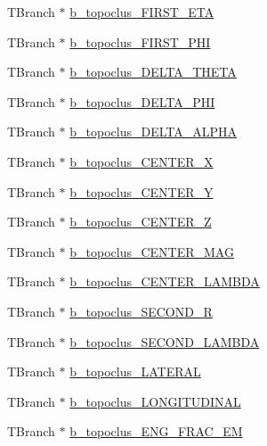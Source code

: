 \begin{DoxyCompactItemize}
T\+Branch $\ast$ \hyperlink{classXMLWriter_aa6c215ca55351d5ff1705ed5ba0a43f6}{b\+\_\+topoclus\+\_\+\+F\+I\+R\+S\+T\+\_\+\+E\+TA}
\item 
T\+Branch $\ast$ \hyperlink{classXMLWriter_aa2acb0af74a1f31832cbe17f22d8b048}{b\+\_\+topoclus\+\_\+\+F\+I\+R\+S\+T\+\_\+\+P\+HI}
\item 
T\+Branch $\ast$ \hyperlink{classXMLWriter_a5fbbe6f789deea441eea3dc49c8a2bda}{b\+\_\+topoclus\+\_\+\+D\+E\+L\+T\+A\+\_\+\+T\+H\+E\+TA}
\item 
T\+Branch $\ast$ \hyperlink{classXMLWriter_a69a01aa3d4d8983b89ee5078d4bc3b75}{b\+\_\+topoclus\+\_\+\+D\+E\+L\+T\+A\+\_\+\+P\+HI}
\item 
T\+Branch $\ast$ \hyperlink{classXMLWriter_ac01d4e792de885aea8e76552756e488a}{b\+\_\+topoclus\+\_\+\+D\+E\+L\+T\+A\+\_\+\+A\+L\+P\+HA}
\item 
T\+Branch $\ast$ \hyperlink{classXMLWriter_a7a76e5eb327c5206fa2926d177bcd1a7}{b\+\_\+topoclus\+\_\+\+C\+E\+N\+T\+E\+R\+\_\+X}
\item 
T\+Branch $\ast$ \hyperlink{classXMLWriter_ad42b0feca27c6511e23ac357f69f4d5c}{b\+\_\+topoclus\+\_\+\+C\+E\+N\+T\+E\+R\+\_\+Y}
\item 
T\+Branch $\ast$ \hyperlink{classXMLWriter_a4a1e7da438de19d0f9b9e650c7ea8674}{b\+\_\+topoclus\+\_\+\+C\+E\+N\+T\+E\+R\+\_\+Z}
\item 
T\+Branch $\ast$ \hyperlink{classXMLWriter_ae87fc693b612f835334cff7e3eddddce}{b\+\_\+topoclus\+\_\+\+C\+E\+N\+T\+E\+R\+\_\+\+M\+AG}
\item 
T\+Branch $\ast$ \hyperlink{classXMLWriter_a6f1cae295c92bc0edb53d4856d59a99d}{b\+\_\+topoclus\+\_\+\+C\+E\+N\+T\+E\+R\+\_\+\+L\+A\+M\+B\+DA}
\item 
T\+Branch $\ast$ \hyperlink{classXMLWriter_a5f3d5b2e51ed054b477dc99b98c028b3}{b\+\_\+topoclus\+\_\+\+S\+E\+C\+O\+N\+D\+\_\+R}
\item 
T\+Branch $\ast$ \hyperlink{classXMLWriter_afaff54f24b77f2b796bc4ba45e221760}{b\+\_\+topoclus\+\_\+\+S\+E\+C\+O\+N\+D\+\_\+\+L\+A\+M\+B\+DA}
\item 
T\+Branch $\ast$ \hyperlink{classXMLWriter_aace6069e3eaa20393b9aacbcdbd837d7}{b\+\_\+topoclus\+\_\+\+L\+A\+T\+E\+R\+AL}
\item 
T\+Branch $\ast$ \hyperlink{classXMLWriter_aff38a8f0d808fce7c39e7c0c6a1bcb33}{b\+\_\+topoclus\+\_\+\+L\+O\+N\+G\+I\+T\+U\+D\+I\+N\+AL}
\item 
T\+Branch $\ast$ \hyperlink{classXMLWriter_a7095cfb71e954c6545c3d3dd68d98e89}{b\+\_\+topoclus\+\_\+\+E\+N\+G\+\_\+\+F\+R\+A\+C\+\_\+\+EM}

\end{DoxyCompactItemize}
